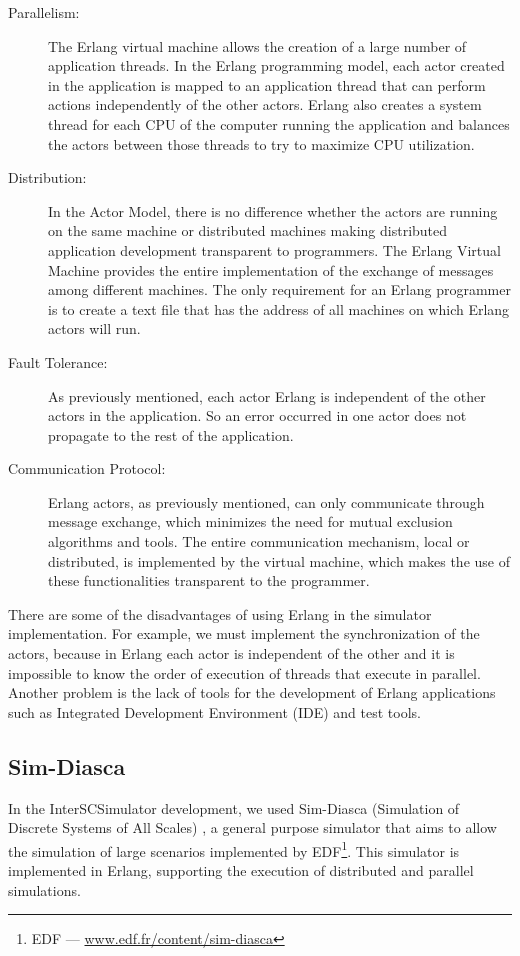 \begin{description}

\item[Parallelism:] The Erlang virtual machine allows the creation of a large number of application threads. In the Erlang programming model, each actor created in the application is mapped to an application thread that can perform actions independently of the other actors. Erlang also creates a system thread for each CPU of the computer running the application and balances the actors between those threads to try to maximize CPU utilization.
\item[Distribution:] In the Actor Model, there is no difference whether the actors are running on the same machine or distributed machines making distributed application development transparent to programmers. The Erlang Virtual Machine provides the entire implementation of the exchange of messages among different machines. The only requirement for an Erlang programmer is to create a text file that has the address of all machines on which Erlang actors will run.
\item[Fault Tolerance:] As previously mentioned, each actor Erlang is independent of the other actors in the application. So an error occurred in one actor does not propagate to the rest of the application.
\item[Communication Protocol: ] Erlang actors, as previously mentioned, can only communicate through message exchange, which minimizes the need for mutual exclusion algorithms and tools. The entire communication mechanism, local or distributed, is implemented by the virtual machine, which makes the use of these functionalities transparent to the programmer.
\end{description}

There are some of the disadvantages of using Erlang in the simulator implementation. For example, we must implement the synchronization of the actors, because in Erlang each actor is independent of the other and it is impossible to know the order of execution of threads that execute in parallel. Another problem is the lack of tools for the development of Erlang applications such as Integrated Development Environment (IDE) and test tools.

\subsection{Sim-Diasca}
\label{subsub:simdiasca}

In the InterSCSimulator development, we used Sim-Diasca (Simulation of Discrete Systems of All Scales) \citep{song2011performance}, a general purpose simulator that aims to allow the simulation of large scenarios implemented by EDF\footnote{EDF --- \url{www.edf.fr/content/sim-diasca}}. This simulator is implemented in Erlang, supporting the execution of distributed and parallel simulations.

